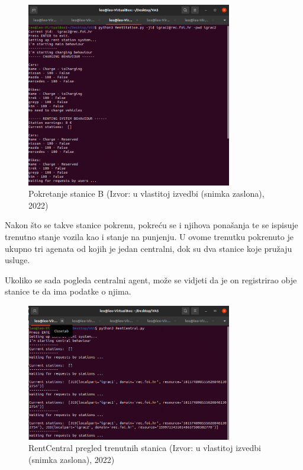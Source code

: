 \documentclass{foi}
\begin{document}
\begin{figure}[H]
	\centering
	\includegraphics[width=0.8\textwidth]{slike/vas3}
	\caption{Pokretanje stanice B (Izvor: u vlastitoj izvedbi (snimka zaslona), 2022)}
\end{figure}

Nakon što se takve stanice pokrenu, pokreću se i njihova ponašanja te se ispisuje trenutno stanje vozila kao i stanje na punjenju. U ovome trenutku pokrenuto je ukupno tri agenata od kojih je jedan centralni, dok su dva stanice koje pružaju usluge. 

Ukoliko se sada pogleda centralni agent, može se vidjeti da je on registrirao obje stanice te da ima podatke o njima. 

\begin{figure}[H]
	\centering
	\includegraphics[width=0.8\textwidth]{slike/vas4}
	\caption{RentCentral pregled trenutnih stanica (Izvor: u vlastitoj izvedbi (snimka zaslona), 2022)}
\end{figure}
\end{document}
